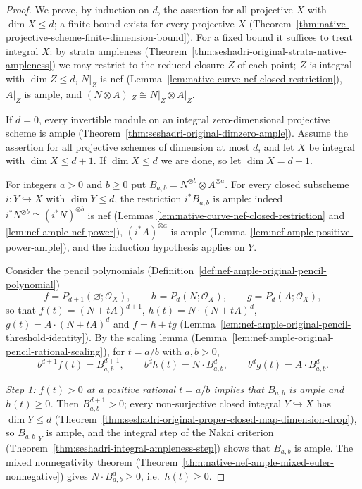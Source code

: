 \begin{proof}
We prove, by induction on $d$, the assertion for all projective $X$ with $\dim X\le d$; a
finite bound exists for every projective $X$
(Theorem~\ref{thm:native-projective-scheme-finite-dimension-bound}). For a fixed bound it
suffices to treat integral $X$: by strata ampleness
(Theorem~\ref{thm:seshadri-original-strata-native-ampleness}) we may restrict to the reduced
closure $Z$ of each point; $Z$ is integral with $\dim Z\le d$, $N|_Z$ is nef
(Lemma~\ref{lem:native-curve-nef-closed-restriction}), $A|_Z$ is ample, and
$(N\otimes A)|_Z\cong N|_Z\otimes A|_Z$.

If $d=0$, every invertible module on an integral zero-dimensional projective scheme is ample
(Theorem~\ref{thm:seshadri-original-dimzero-ample}). Assume the assertion for all projective
schemes of dimension at most $d$, and let $X$ be integral with $\dim X\le d+1$. If
$\dim X\le d$ we are done, so let $\dim X=d+1$.

For integers $a>0$ and $b\ge0$ put $B_{a,b}=N^{\otimes b}\otimes A^{\otimes a}$. For every closed
subscheme $i:Y\hookrightarrow X$ with $\dim Y\le d$, the restriction $i^*B_{a,b}$ is ample:
indeed $i^*N^{\otimes b}\cong(i^*N)^{\otimes b}$ is nef (Lemmas
\ref{lem:native-curve-nef-closed-restriction} and \ref{lem:nef-ample-nef-power}),
$(i^*A)^{\otimes a}$ is ample (Lemma~\ref{lem:nef-ample-positive-power-ample}), and the induction
hypothesis applies on $Y$.

Consider the pencil polynomials (Definition~\ref{def:nef-ample-original-pencil-polynomial})
\[
 f=P_{d+1}(\varnothing;\mathcal O_X),\qquad h=P_d(N;\mathcal O_X),\qquad
 g=P_d(A;\mathcal O_X),
\]
so that $f(t)=(N+tA)^{d+1}$, $h(t)=N\cdot(N+tA)^d$, $g(t)=A\cdot(N+tA)^d$ and $f=h+tg$
(Lemma~\ref{lem:nef-ample-original-pencil-threshold-identity}). By the scaling lemma
(Lemma~\ref{lem:nef-ample-original-pencil-rational-scaling}), for $t=a/b$ with $a,b>0$,
\[
 b^{d+1}f(t)=B_{a,b}^{d+1},\qquad b^dh(t)=N\cdot B_{a,b}^d,\qquad b^dg(t)=A\cdot B_{a,b}^d .
\]

\emph{Step 1: $f(t)>0$ at a positive rational $t=a/b$ implies that $B_{a,b}$ is ample and
$h(t)\ge0$.} Then $B_{a,b}^{d+1}>0$; every non-surjective closed integral $Y\hookrightarrow X$
has $\dim Y\le d$ (Theorem~\ref{thm:seshadri-original-proper-closed-map-dimension-drop}), so
$B_{a,b}|_Y$ is ample, and the integral step of the Nakai criterion
(Theorem~\ref{thm:seshadri-integral-ampleness-step}) shows that $B_{a,b}$ is ample. The
mixed nonnegativity theorem (Theorem~\ref{thm:native-nef-ample-mixed-euler-nonnegative})
gives $N\cdot B_{a,b}^d\ge0$, i.e.\ $h(t)\ge0$.


\end{proof}
